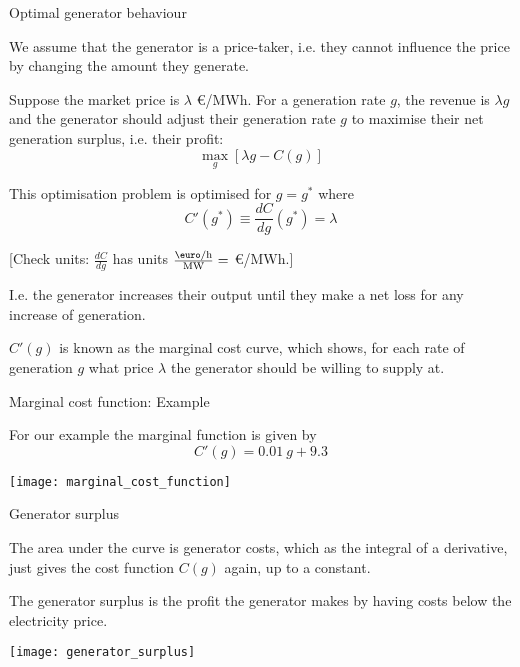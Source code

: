 \documentclass[10pt,dvipsnames]{beamer}
\def\l{\lambda}
\begin{document}
\begin{frame}{Optimal generator behaviour}

  We assume that the generator is a \alert{price-taker},
  i.e. they cannot influence the price by changing the amount they
  generate.

  Suppose the market price is $\lambda$ \euro/MWh. For a generation
  rate $g$, the revenue is $\l g$ and the generator should adjust their
generation rate $g$ to maximise their \alert{net generation surplus}, i.e. their profit:
  \begin{equation*}
    \max_g \left[ \l g - C(g) \right]
  \end{equation*}

  This optimisation problem is optimised for $g=g^*$ where
  \begin{equation*}
    C'(g^*) \equiv \frac{dC}{dg} (g^*) =  \l
  \end{equation*}

  [Check units: $\frac{dC}{dg}$ has units $\frac{\textrm{\euro/h}}{\textrm{MW}} = $ \euro/MWh.]

  I.e. the generator increases their output until they make a net loss for any increase of generation.

  $C'(g)$ is known as the \alert{marginal cost curve}, which shows,
  for each rate of generation $g$ what price $\l$ the generator should be
  willing to supply at.


\end{frame}



\begin{frame}{Marginal cost function: Example}

  For our example the marginal function is given by
  \begin{equation*}
    C'(g) = 0.01~g + 9.3
  \end{equation*}

  \centering
  \texttt{[image: marginal\_cost\_function]}

\end{frame}





\begin{frame}{Generator surplus}

  The area under the curve is generator costs, which as the integral
  of a derivative, just gives the cost function $C(g)$ again, up to a
  constant.


  The \alert{generator surplus} is the profit the generator makes by
  having costs below the electricity price.

  \centering
  \texttt{[image: generator\_surplus]}

\end{frame}
\end{document}
